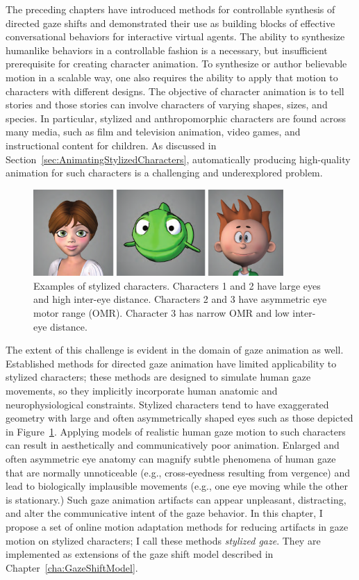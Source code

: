 The preceding chapters have introduced methods for controllable synthesis of directed gaze shifts and demonstrated their use as building blocks of effective conversational behaviors for interactive virtual agents. The ability to synthesize humanlike behaviors in a controllable fashion is a necessary, but insufficient prerequisite for creating character animation.
To synthesize or author believable motion in a scalable way, one also requires the ability to apply that motion to characters with different designs. The objective of character animation is to tell stories and those stories can involve characters of varying shapes, sizes, and species. In particular, stylized and anthropomorphic characters are found across many media, such as film and television animation, video games, and instructional content for children. As discussed in Section~\ref{sec:AnimatingStylizedCharacters}, automatically producing high-quality animation for such characters is a challenging and underexplored problem.

\begin{figure}
\centering
\includegraphics[width=0.85\textwidth]{stylizedgaze/Figures/StylizedCharacterExamples-small.pdf}
\caption{Examples of stylized characters. Characters 1 and 2 have large eyes and high inter-eye distance. Characters 2 and 3 have asymmetric eye motor range (OMR). Character 3 has narrow OMR and low inter-eye distance.}
\label{fig:StylizedCharacterExamples}
\end{figure}

The extent of this challenge is evident in the domain of gaze animation as well. Established methods for directed gaze animation have limited applicability to stylized characters; these methods are designed to simulate human gaze movements, so they implicitly incorporate human anatomic and neurophysiological constraints. Stylized characters tend to have exaggerated geometry with large and often asymmetrically shaped eyes such as those depicted in Figure~\ref{fig:StylizedCharacterExamples}. Applying models of realistic human gaze motion to such characters can result in aesthetically and communicatively poor animation. Enlarged and often asymmetric eye anatomy can magnify subtle phenomena of human gaze that are normally unnoticeable (e.g., cross-eyedness resulting from vergence) and lead to biologically implausible movements (e.g., one eye moving while the other is stationary.) Such gaze animation artifacts can appear unpleasant, distracting, and alter the communicative intent of the gaze behavior. In this chapter, I propose a set of online motion adaptation methods for reducing artifacts in gaze motion on stylized characters; I call these methods \emph{stylized gaze}. They are implemented as extensions of the gaze shift model described in Chapter~\ref{cha:GazeShiftModel}.


